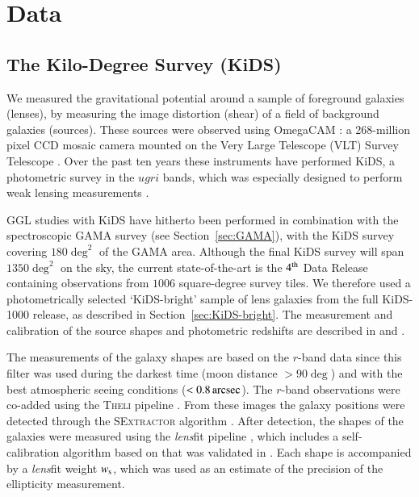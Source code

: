 \documentclass{aa}
\newcommand{\as}{\,{\rm arcsec}}
\newcommand{\un}[1]{_{\rm #1}}
\begin{document}
\section{Data}
\label{sec:Data}

\subsection{The Kilo-Degree Survey (KiDS)}
\label{sec:KiDS}

We measured the gravitational potential around a sample of foreground galaxies (lenses), by measuring the image distortion (shear) of a field of background galaxies (sources). These sources were observed using OmegaCAM \cite[]{kuijken2011}: a 268-million pixel CCD mosaic camera mounted on the Very Large Telescope (VLT) Survey Telescope \cite[]{capaccioli2011}. Over the past ten years these instruments have performed KiDS, a photometric survey in the $ugri$ bands, which was especially designed to perform weak lensing measurements \cite[]{dejong2013}.

GGL studies with KiDS have hitherto been performed in combination with the spectroscopic GAMA survey (see Section~\ref{sec:GAMA}), with the KiDS survey covering $180 \deg^2$ of the GAMA area. Although the final KiDS survey will span $1350 \deg^2$ on the sky, the current state-of-the-art is the $4^{\rm th}$ Data Release \cite[KiDS-1000;][]{kuijken2019} containing observations from $1006$ square-degree survey tiles. We therefore used a photometrically selected `KiDS-bright' sample of lens galaxies from the full KiDS-1000 release, as described in Section~\ref{sec:KiDS-bright}. The measurement and calibration of the source shapes and photometric redshifts are described in \cite{kuijken2019,giblin2020} and \cite{hildebrandt2020}.

The measurements of the galaxy shapes are based on the $r$-band data since this filter was used during the darkest time (moon distance $> 90 \deg$) and with the best atmospheric seeing conditions ($<0.8 \as$). The $r$-band observations were co-added using the {\scshape Theli} pipeline \cite[]{erben2013}. From these images the galaxy positions were detected through the \textsc{SExtractor} algorithm \cite[]{bertin1996}. After detection, the shapes of the galaxies were measured using the \emph{lens}fit pipeline \cite[]{miller2007,miller2013}, which includes a self-calibration algorithm based on \cite{fenechconti2017} that was validated in \cite{kannawadi2019}. Each shape is accompanied by a \emph{lens}fit weight $w\un{s}$, which was used as an estimate of the precision of the ellipticity measurement.
\end{document}
